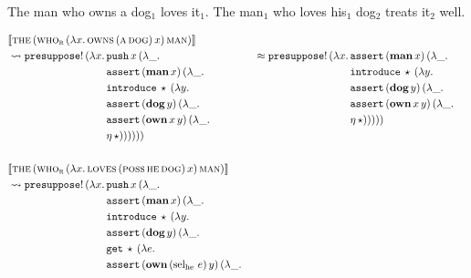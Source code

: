 \begin{exe}
   The man who owns a dog$_1$ loves
  it$_1$.
   The man$_1$ who loves his$_1$ dog$_2$
  treats it$_2$ well.
\end{exe}

\begin{align*}
& \sem{\ap{\abs{the}}{(\app{\abs{who}_{\abs{r}}}{(\lam{x}{\app{\abs{owns}}{(\ap{\abs{a}}{\abs{dog}})}{x}})}{\abs{man}})}} \\
& \leadsto \ap{\op{presuppose}!}{(\lam{x}{\begin{aligned}[t]
    &\app{\op{push}}{x}{(\lam{\_}{ \\
    &\app{\op{assert}}{(\ap{\obj{man}}{x})}{(\lam{\_}{ \\
    &\app{\op{introduce}}{\star}{(\lam{y}{ \\
    &\app{\op{assert}}{(\ap{\obj{dog}}{y})}{(\lam{\_}{ \\
    &\app{\op{assert}}{(\app{\obj{own}}{x}{y})}{(\lam{\_}{ \\
    &\etaE{\star}})}})}})}})}})})
  \end{aligned}}}
& & \approx \ap{\op{presuppose}!}{(\lam{x}{\begin{aligned}[t]
    &\app{\op{assert}}{(\ap{\obj{man}}{x})}{(\lam{\_}{ \\
    &\app{\op{introduce}}{\star}{(\lam{y}{ \\
    &\app{\op{assert}}{(\ap{\obj{dog}}{y})}{(\lam{\_}{ \\
    &\app{\op{assert}}{(\app{\obj{own}}{x}{y})}{(\lam{\_}{ \\
    &\etaE{\star}})}})}})}})})
  \end{aligned}}} \\
  \\
& \sem{\ap{\abs{the}}{(\app{\abs{who}_{\abs{r}}}{(\lam{x}{\app{\abs{loves}}{(\app{\abs{poss}}{\abs{he}}{\abs{dog}})}{x}})}{\abs{man}})}} \\
& \leadsto \ap{\op{presuppose}!}{(\lam{x}{\begin{aligned}[t]
    &\app{\op{push}}{x}{(\lam{\_}{ \\
    &\app{\op{assert}}{(\ap{\obj{man}}{x})}{(\lam{\_}{ \\
    &\app{\op{introduce}}{\star}{(\lam{y}{ \\
    &\app{\op{assert}}{(\ap{\obj{dog}}{y})}{(\lam{\_}{ \\
    &\app{\op{get}}{\star}{(\lam{e}{ \\
    &\app{\op{assert}}{(\app{\obj{own}}{(\ap{\selhe}{e})}{y})}{(\lam{\_}{ \\
}}}}}}}}}}}}
\end{aligned}}}
\end{align*}
